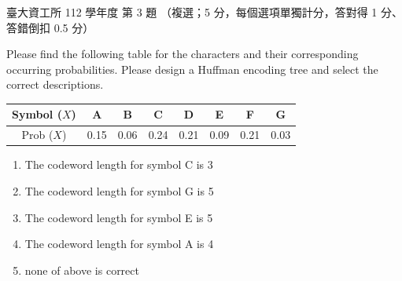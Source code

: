\begin{pastexam}[label={px:ntu-112-dsa-03}]{臺大資工所 112 學年度 第 3 題}
（複選；5 分，每個選項單獨計分，答對得 1 分、答錯倒扣 0.5 分）

Please find the following table for the characters and their corresponding occurring
probabilities. Please design a Huffman encoding tree and select the correct descriptions.
\begin{center}
\begin{tabular}{|c|c|c|c|c|c|c|c|}
\hline
Symbol ($X$) & A & B & C & D & E & F & G \\ \hline
Prob ($X$) & 0.15 & 0.06 & 0.24 & 0.21 & 0.09 & 0.21 & 0.03 \\ \hline
\end{tabular}
\end{center}
\begin{enumerate}[label=(\Alph*)]
\item The codeword length for symbol C is 3
\item The codeword length for symbol G is 5
\item The codeword length for symbol E is 5
\item The codeword length for symbol A is 4
\item none of above is correct
\end{enumerate}
\end{pastexam}

